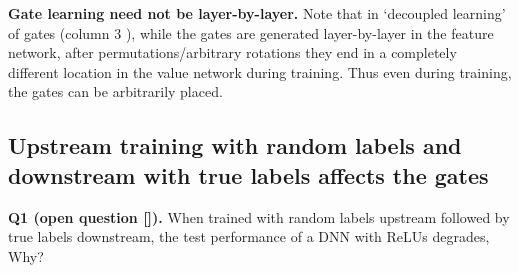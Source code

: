 \textbf{Gate learning need not be layer-by-layer.} Note that  in `decoupled learning' of gates (column $3$ ), while the gates are generated layer-by-layer in the feature network, after permutations/arbitrary rotations they end in a completely different location in the value network during training. Thus even during training, the gates can be arbitrarily placed.

\subsection{Upstream training with random labels and downstream with true labels affects the gates}\label{sec:exp2}


\textbf{Q1 (open question []).} {When trained with random labels upstream followed by true labels downstream, the test performance of a DNN with ReLUs degrades, Why?}

